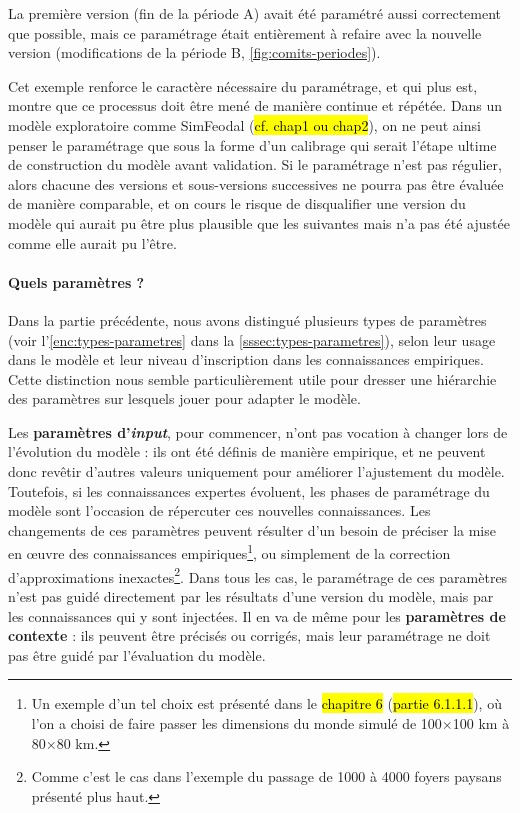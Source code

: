 La première version (fin de la période A) avait été paramétré aussi correctement que possible, mais ce paramétrage était entièrement à refaire avec la nouvelle version (modifications de la période B, \cref{fig:comits-periodes}).

Cet exemple renforce le caractère nécessaire du paramétrage, et qui plus est, montre que ce processus doit être mené de manière continue et répétée.
Dans un modèle exploratoire comme SimFeodal (\hl{cf. chap1 ou chap2}), on ne peut ainsi penser le paramétrage que sous la forme d'un calibrage qui serait l'étape ultime de construction du modèle avant validation.
Si le paramétrage n'est pas régulier, alors chacune des versions et sous-versions successives ne pourra pas être évaluée de manière comparable, et on cours le risque de disqualifier une version du modèle qui aurait pu être plus plausible que les suivantes mais n'a pas été ajustée comme elle aurait pu l'être.

\paragraph{Quels paramètres ?} \label{sssec:quels-parametres}


Dans la partie précédente, nous avons distingué plusieurs types de paramètres (voir l'\cref{enc:types-parametres} dans la \cref{sssec:types-parametres}), selon leur usage dans le modèle et leur niveau d'inscription dans les connaissances empiriques.
Cette distinction nous semble particulièrement utile pour dresser une hiérarchie des paramètres sur lesquels jouer pour adapter le modèle.

Les \textbf{paramètres d'\textit{input}}, pour commencer, n'ont pas vocation à changer lors de l'évolution du modèle : ils ont été définis de manière empirique, et ne peuvent donc revêtir d'autres valeurs uniquement pour améliorer l'ajustement du modèle.
Toutefois, si les connaissances expertes évoluent, les phases de paramétrage du modèle sont l'occasion de répercuter ces nouvelles connaissances.
Les changements de ces paramètres peuvent résulter d'un besoin de préciser la mise en œuvre des connaissances empiriques\footnote{
	Un exemple d'un tel choix est présenté dans le \hl{chapitre 6} (\hl{partie 6.1.1.1}), où l'on a choisi de faire passer les dimensions du monde simulé de 100×100 km à 80×80 km.
}, ou simplement de la correction d'approximations inexactes\footnote{
	Comme c'est le cas dans l'exemple du passage de 1000 à 4000 foyers paysans présenté plus haut.
}.
Dans tous les cas, le paramétrage de ces paramètres n'est pas guidé directement par les résultats d'une version du modèle, mais par les connaissances qui y sont injectées.
Il en va de même pour les \textbf{paramètres de contexte} : ils peuvent être précisés ou corrigés, mais leur paramétrage ne doit pas être guidé par l'évaluation du modèle.

